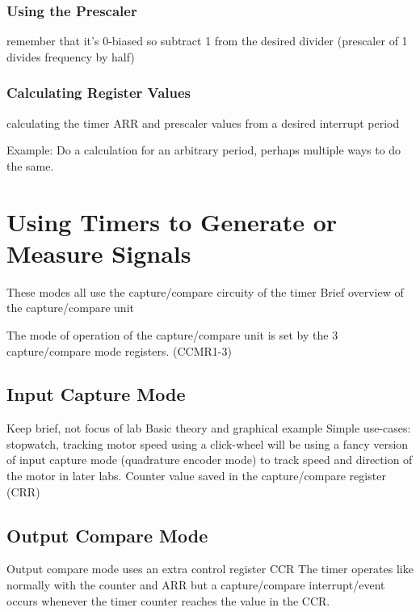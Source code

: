 \documentclass[11pt,fleqn]{book} %
\begin{document}
    \subsubsection{Using the Prescaler}
        remember that it's 0-biased so subtract 1 from the desired divider
        (prescaler of 1 divides frequency by half)
    
    \subsubsection{Calculating Register Values}
        calculating the timer ARR and prescaler values from a desired interrupt period 
        	
        \begin{example} 
                Example: Do a calculation for an arbitrary period, perhaps multiple ways to do the same. 
        \end{example}
    

\section{Using Timers to Generate or Measure Signals}
    These modes all use the capture/compare circuity of the timer
    Brief overview of the capture/compare unit
    
    The mode of operation of the capture/compare unit is set by the 3 capture/compare mode registers. (CCMR1-3)				
    
    \subsection{Input Capture Mode}
        Keep brief, not focus of lab
        Basic theory and graphical example		
        Simple use-cases: stopwatch, tracking motor speed using a click-wheel
            will be using a fancy version of input capture mode (quadrature encoder mode) to track speed and direction of the motor in later labs.
        Counter value saved in the capture/compare register (CRR)
    
    \subsection{Output Compare Mode}
        Output compare mode uses an extra control register CCR
        The timer operates like normally with the counter and ARR but a capture/compare interrupt/event occurs whenever the timer counter reaches the value in the CCR.
        
\end{document}
